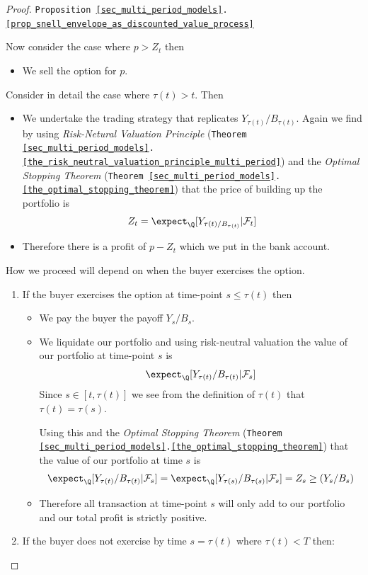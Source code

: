 \documentclass[11pt,a4paper]{article}
\begin{document}
\begin{proof}{\texttt{Proposition \ref{sec_multi_period_models}.\ref{prop_snell_envelope_as_discounted_value_process}}}
    \par Now consider the case where $p>Z_t$ then
    \begin{itemize}
      \item We sell the option for $p$.
    \end{itemize}
    Consider in detail the case where $\tau(t)>t$. Then
    \begin{itemize}
      \item We undertake the trading strategy that replicates $Y_{\tau(t)}/B_{\tau(t)}$. Again we find by using \textit{Risk-Netural Valuation Principle} (\texttt{Theorem \ref{sec_multi_period_models}.\ref{the_risk_neutral_valuation_principle_multi_period}}) and the \textit{Optimal Stopping Theorem} (\texttt{Theorem \ref{sec_multi_period_models}.\ref{the_optimal_stopping_theorem}}) that the price of building up the portfolio is
      \[ Z_t=\expect_\Q[Y_{\tau(t)/B_{\tau(t)}}|\mathcal{F}_t] \]
      \item Therefore there is a profit of $p-Z_t$ which we put in the bank account.
    \end{itemize}
    How we proceed will depend on when the buyer exercises the option.
    \begin{enumerate}
      \item If the buyer exercises the option at time-point $s\leq\tau(t)$ then
      \begin{itemize}
        \item We pay the buyer the payoff $Y_s/B_s$.
        \item We liquidate our portfolio and using risk-neutral valuation the value of our portfolio at time-point $s$ is
        \[ \expect_\Q[Y_{\tau(t)}/B_{\tau(t)}|\mathcal{F}_s] \]
        Since $s\in[t,\tau(t)]$ we see from the definition of $\tau(t)$ that $\tau(t)=\tau(s)$.
        \par Using this and the \textit{Optimal Stopping Theorem} (\texttt{Theorem \ref{sec_multi_period_models}.\ref{the_optimal_stopping_theorem}}) that the value of our portfolio at time $s$ is
        \[ \expect_\Q[Y_{\tau(t)}/B_{\tau(t)}|\mathcal{F}_s]=\expect_\Q[Y_{\tau(s)}/B_{\tau(s)}|\mathcal{F}_s]=Z_s\geq (Y_s/B_s) \]
        \item Therefore all transaction at time-point $s$ will only add to our portfolio and our total profit is strictly positive.
      \end{itemize}
      \item If the buyer does not exercise by time $s=\tau(t)$ where $\tau(t)<T$ then:
      \begin{itemize}

\end{itemize}
\end{enumerate}
\end{proof}
\end{document}
